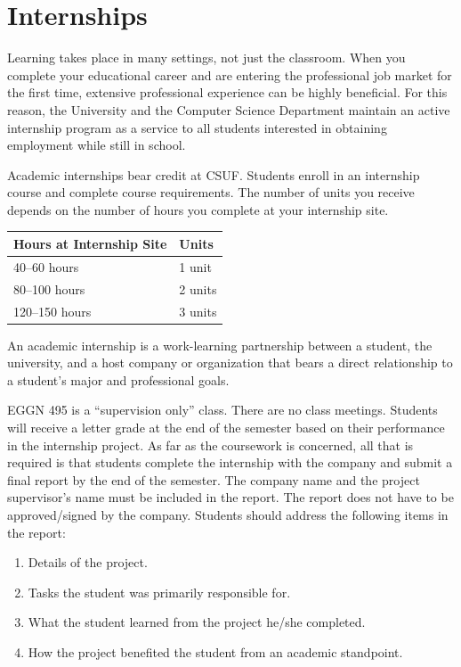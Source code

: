 \documentclass{book}
\newcommand{\CampusName}{CSUF}
\begin{document}
\section{Internships}

Learning takes place in many settings, not just the classroom. When you complete your educational career and are entering the professional job market for the first time, extensive professional experience can be highly beneficial. For this reason, the University and the Computer Science Department maintain an active internship program as a service to all students interested in obtaining employment while still in school.

Academic internships bear credit at \CampusName. Students enroll in an internship course and complete course requirements. The number of units you receive depends on the number of hours you complete at your internship site.

\begin{center}
\begin{tabular}{|l|l|} \hline
  \textbf{Hours at Internship Site} & \textbf{Units} \\ \hline
  40--60 hours & 1 unit \\ \hline
  80--100 hours & 2 units \\ \hline
  120--150 hours & 3 units \\ \hline
\end{tabular}
\end{center}

An academic internship is a work-learning partnership between a student, the university, and a host company or organization that bears a direct relationship to a student’s major and professional goals.

EGGN 495 is a ``supervision only'' class. There are no class meetings. Students will receive a letter grade at the end of the semester based on their performance in the internship project. As far as the coursework is concerned, all that is required is that students complete the internship with the company and submit a final report by the end of the semester. The company name and the project supervisor's name must be included in the report. The report does not have to be approved/signed by the company. Students should address the following items in the report:
\begin{enumerate}
\item Details of the project.
\item Tasks the student was primarily responsible for.
\item What the student learned from the project he/she completed.
\item How the project benefited the student from an academic standpoint.
\end{enumerate}
\end{document}
